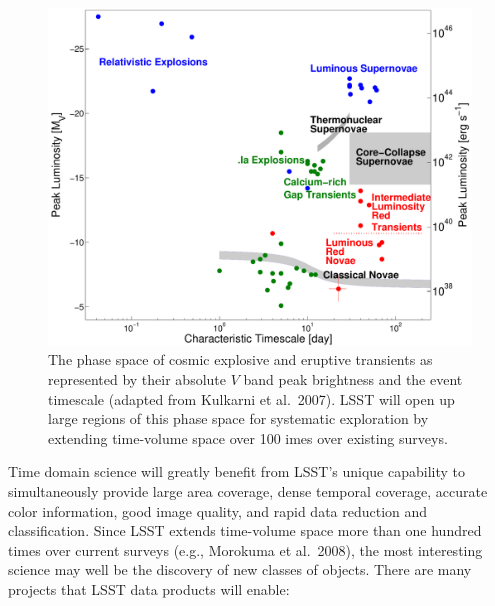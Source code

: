 \documentclass{emulateapj}
\begin{document}
\begin{figure}
\hskip -0.1in
\vskip -0.1in
\includegraphics[width=1.0\hsize,clip]{taumv.pdf}
\caption{The phase space of cosmic explosive and eruptive transients as
represented by their absolute $V$ band peak brightness and the 
event timescale (adapted from Kulkarni et al.~2007). LSST will open up large 
regions of this phase space for systematic exploration by extending
time-volume space over 100 imes over existing surveys.} 
\label{Fig:shri}
\end{figure}

Time domain science will greatly benefit from LSST's unique capability to simultaneously
provide large area coverage, dense temporal coverage, accurate color information,
good image quality, and rapid data reduction and classification. Since LSST extends 
time-volume space more than one hundred times over current surveys (e.g., Morokuma et al.~2008), 
the most interesting science may well be the discovery of new classes of objects.  
There are many projects that LSST data products will enable:
\end{document}
